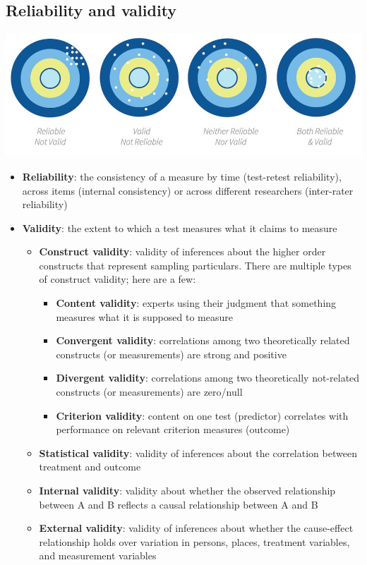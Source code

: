 \documentclass[
]{book}
\providecommand{\tightlist}{%
  \setlength{\itemsep}{0pt}\setlength{\parskip}{0pt}}
\begin{document}
\hypertarget{reliability-and-validity}{%
\subsection{Reliability and validity}\label{reliability-and-validity}}

\includegraphics{images/01-intro/reliability-validity.jpg}

\begin{itemize}
\item
  \textbf{Reliability}: the consistency of a measure by time (test-retest reliability), across items (internal consistency) or across different researchers (inter-rater reliability)
\item
  \textbf{Validity}: the extent to which a test measures what it claims to measure

  \begin{itemize}
  \item
    \textbf{Construct validity}: validity of inferences about the higher order constructs that represent sampling particulars. There are multiple types of construct validity; here are a few:

    \begin{itemize}
    \tightlist
    \item
      \textbf{Content validity}: experts using their judgment that something measures what it is supposed to measure
    \item
      \textbf{Convergent validity}: correlations among two theoretically related constructs (or measurements) are strong and positive
    \item
      \textbf{Divergent validity}: correlations among two theoretically not-related constructs (or measurements) are zero/null
    \item
      \textbf{Criterion validity}: content on one test (predictor) correlates with performance on relevant criterion measures (outcome)
    \end{itemize}
  \item
    \textbf{Statistical validity}: validity of inferences about the correlation between treatment and outcome
  \item
    \textbf{Internal validity}: validity about whether the observed relationship between A and B reflects a causal relationship between A and B
  \item
    \textbf{External validity}: validity of inferences about whether the cause-effect relationship holds over variation in persons, places, treatment variables, and measurement variables
  \end{itemize}
\end{itemize}
\end{document}
